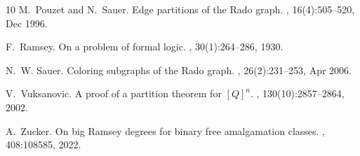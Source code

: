 \documentclass[10pt,a4paper]{article}
\theoremstyle{plain}
\theoremstyle{definition}
\begin{document}
\begin{thebibliography}{10}
M.~Pouzet and N.~Sauer.
\newblock Edge partitions of the {R}ado graph.
, 16(4):505--520, Dec 1996.

F.~Ramsey.
\newblock On a problem of formal logic.
, 30(1):264--286, 1930.

N.~W. Sauer.
\newblock Coloring subgraphs of the {R}ado graph.
, 26(2):231--253, Apr 2006.

V.~Vuksanovic.
\newblock A proof of a partition theorem for $[{Q}]^n$.
,
  130(10):2857--2864, 2002.

A.~Zucker.
\newblock On big {R}amsey degrees for binary free amalgamation classes.
, 408:108585, 2022.

\end{thebibliography}
\end{document}
